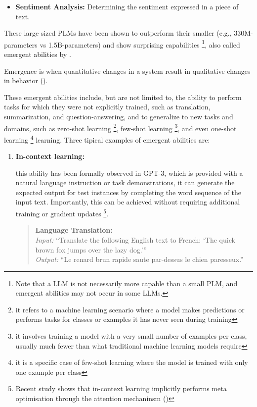 \begin{enumerate}
{\begin{itemize}
			      \item \textbf{Sentiment Analysis:} Determining the sentiment expressed in a piece of text.
		      \end{itemize}
		      These large sized PLMs have been shown to outperform their smaller (e.g., 330M-parameters vs 1.5B-parameters) and show surprising capabilities \footnote{Note that a LLM is not necessarily more capable than a small PLM, and emergent abilities may not occur in some LLMs.}, also called emergent abilities by \textcite{emergent2}.
		      \begin{displayquote}
			      Emergence is when quantitative changes in a system result in qualitative changes in behavior (\textcite{emergent1}).
		      \end{displayquote}
		      These emergent abilities include, but are not limited to, the ability to perform tasks for which they were not explicitly trained, such as translation, summarization, and question-answering, and to generalize to new tasks and domains, such as zero-shot learning \footnote{it refers to a machine learning scenario where a model makes predictions or performs tasks for classes or examples it has never seen during training}, few-shot learning \footnote{it involves training a model with a very small number of examples per class, usually much fewer than what traditional machine learning models require}, and even one-shot learning \footnote{it is a specific case of few-shot learning where the model is trained with only one example per class} learning.
		      Three tipical examples of emergent abilities are:
		      \begin{enumerate}
			      \item \textbf{In-context learning:} {this ability has been formally observed in GPT-3, which is provided with a natural language instruction or task demonstrations, it can generate the expected output for test instances by completing the word sequence of the input text. Importantly, this can be achieved without requiring additional training or gradient updates \footnote{Recent study shows that in-context learning implicitly performs meta optimisation through the attention mechaninsm (\textcite{icl})}.
				            \begin{quote}
					            \textbf{Language Translation:} \\
					            \textit{Input:} {\enquote{Translate the following English text to French: `The quick brown fox jumps over the lazy dog.'}} \\
					            \textit{Output:} {\enquote{Le renard brun rapide saute par-dessus le chien paresseux.}}\\

\end{quote}}
\end{enumerate}}
\end{enumerate}
